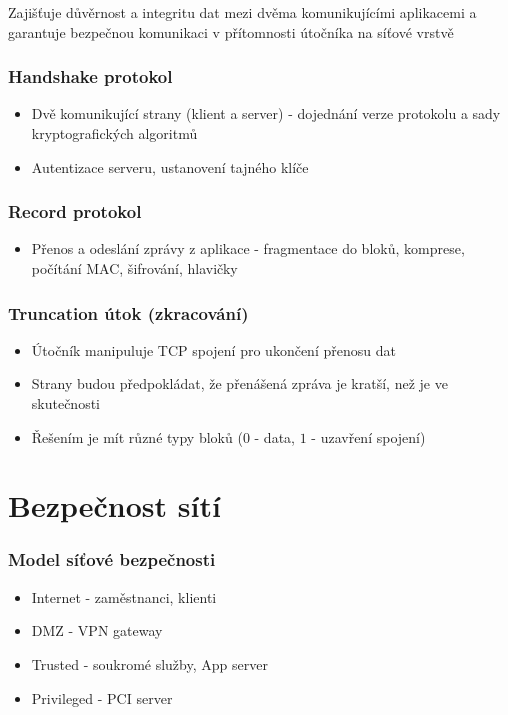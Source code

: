 \documentclass[10pt,a4paper]{article}
\begin{document}
Zajišťuje důvěrnost a integritu dat mezi dvěma komunikujícími aplikacemi a garantuje bezpečnou komunikaci v přítomnosti útočníka na síťové vrstvě

\subsubsection*{Handshake protokol}
\begin{itemize}
    \item Dvě komunikující strany (klient a server) - dojednání verze protokolu a sady kryptografických algoritmů
    \item Autentizace serveru, ustanovení tajného klíče
\end{itemize}

\subsubsection*{Record protokol}
\begin{itemize}
    \item Přenos a odeslání zprávy z aplikace - fragmentace do bloků, komprese, počítání MAC, šifrování, hlavičky
\end{itemize}

\subsubsection*{Truncation útok (zkracování)}
\begin{itemize}
    \item Útočník manipuluje TCP spojení pro ukončení přenosu dat
    \item Strany budou předpokládat, že přenášená zpráva je kratší, než je ve skutečnosti
    \item Řešením je mít různé typy bloků ($0$ - data, $1$ - uzavření spojení)
\end{itemize}



\section{Bezpečnost sítí}

\subsubsection*{Model síťové bezpečnosti}
\begin{itemize}
    \item Internet - zaměstnanci, klienti
    \item DMZ - VPN gateway
    \item Trusted - soukromé služby, App server
    \item Privileged - PCI server
\end{itemize}
\end{document}
